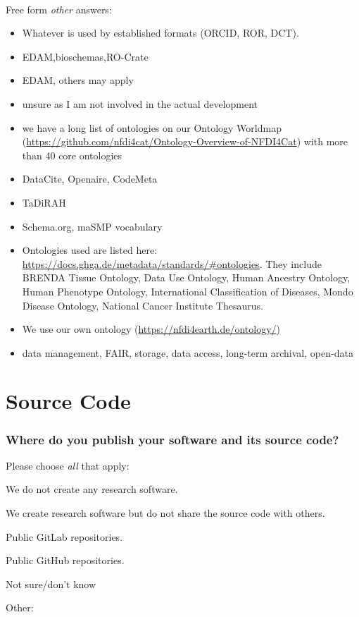 \documentclass[headsepline,titlepage,twoside,12pt,toc=flat,headings=normal]{scrreprt}
\newcommand{\question}[1]{\subsubsection{#1}}
\newcommand{\otherbox}{\fbox{\phantom{This is how big an answer would be.}}}
\begin{document}
\noindent\paragraph{}
Free form \emph{other} answers:
\begin{itemize}
\item Whatever is used by established formats (ORCID, ROR, DCT).
\item EDAM,bioschemas,RO-Crate
\item EDAM, others may apply
\item unsure as I am not involved in the actual development
\item we have a long list of ontologies on our Ontology Worldmap (\url{https://github.com/nfdi4cat/Ontology-Overview-of-NFDI4Cat}) with more than 40 core ontologies
\item DataCite, Openaire, CodeMeta
\item TaDiRAH
\item Schema.org, maSMP vocabulary
\item Ontologies used are listed here: \url{https://docs.ghga.de/metadata/standards/#ontologies}. They include BRENDA Tissue Ontology, Data Use Ontology, Human Ancestry Ontology, Human Phenotype Ontology, International Classification of Diseases, Mondo Disease Ontology, National Cancer Institute Thesaurus.
\item We use our own ontology (\url{https://nfdi4earth.de/ontology/})
\item data management, FAIR, storage, data access, long-term archival, open-data
\end{itemize}

\clearpage
\section{Source Code}
\question{Where do you publish your software and its source code?}
Please choose \emph{all} that apply:

\begin{answers}
\item We do not create any research software.
\item We create research software but do not share the source code with others.
\item Public GitLab repositories.
\item Public GitHub repositories.
\item Not sure/don't know
\item Other: \otherbox
\end{answers}
\end{document}

